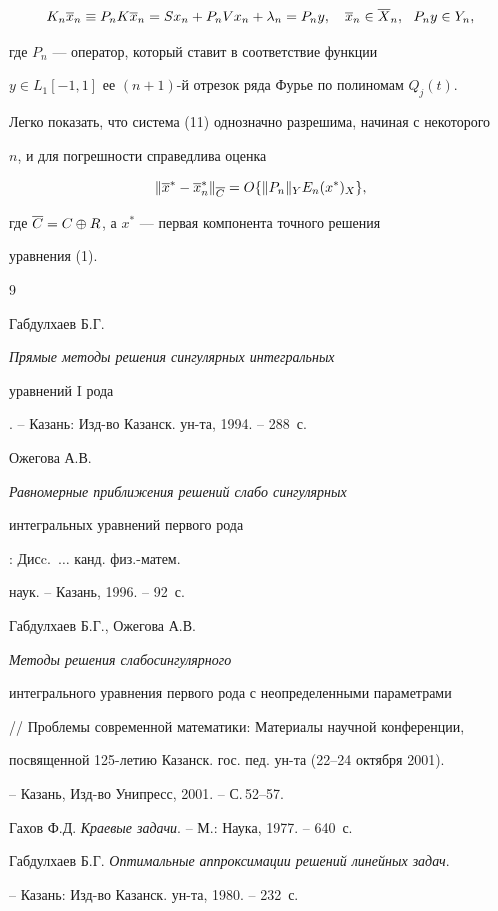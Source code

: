 $$


K_n\ol{x}_n \equiv P_nK\ol{x}_n = Sx_n+P_nVx_n+\lambda_n = P_ny,\quad 


\ol{x}_n\in \ol{X}_n,\ \ P_ny\in Y_n,


$$


где $P_n$ --- оператор, который ставит в соответствие функции


$y\in L_1[-1,1]$ ее $(n+1)$-й отрезок ряда Фурье по полиномам $Q_j(t)$. 





Легко показать, что система (11) однозначно разрешима, начиная с некоторого


$n$, и для погрешности справедлива оценка 


$$


\|\ol{x}^*-\ol{x}^*_n\|_{\ol{C}} = O\{\|P_n\|_Y E_n(x^*)_X\},


$$


где $\overline{C} = C\oplus R$, а $x^*$ --- первая компонента точного решения 


уравнения (1).








\begin{thebibliography}{9}







Габдулхаев Б.Г. {\it Прямые методы решения сингулярных интегральных 


уравнений $\mathrm I$ рода}. -- Казань: Изд-во Казанск. ун-та, 1994. -- 288~с.




Ожегова А.В. {\it Равномерные приближения решений слабо сингулярных 


интегральных уравнений первого рода}: Дисc.~$\dotsc$ канд. физ.-матем.


наук. -- Казань, 1996. -- 92~с.




Габдулхаев Б.Г., Ожегова А.В. {\it Методы решения слабосингулярного 


интегрального уравнения первого рода с неопределенными параметрами}


// Проблемы современной математики: Материалы научной конференции,


посвященной 125-летию Казанск. гос. пед. ун-та (22--24 октября 2001).


-- Казань, Изд-во Унипресс, 2001. -- С.\,52--57.




Гахов Ф.Д. {\it Краевые задачи}. -- М.: Наука, 1977. -- 640~с.




Габдулхаев Б.Г. {\it Оптимальные аппроксимации решений линейных задач}.


-- Казань: Изд-во Казанск. ун-та, 1980. -- 232~с.





\end{thebibliography}





